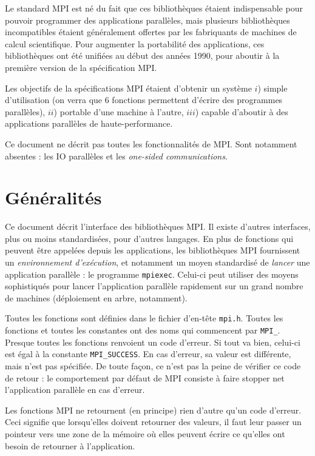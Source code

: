 Le standard MPI est né du fait que ces bibliothèques étaient
indispensable pour pouvoir programmer des applications parallèles,
mais plusieurs bibliothèques incompatibles étaient généralement offertes
par les fabriquants de machines de calcul scientifique. Pour augmenter
la portabilité des applications, ces bibliothèques ont été unifiées au
début des années 1990, pour aboutir à la première version de la
spécification MPI.

Les objectifs de la spécifications MPI étaient d'obtenir un système $i$) simple
d'utilisation (on verra que 6 fonctions permettent d'écrire des programmes
parallèles), $ii$) portable d'une machine à l'autre, $iii$) capable d'aboutir à
des applications parallèles de haute-performance.

Ce document ne décrit pas toutes les fonctionnalités de MPI. Sont notamment
absentes : les IO parallèles et les \og \emph{one-sided communications}\fg.

\section{Généralités}

Ce document décrit l'interface  des bibliothèques MPI. Il existe
d'autres interfaces, plus ou moins standardisées, pour d'autres langages. En
plus de fonctions qui peuvent être appelées depuis les applications, les
bibliothèques MPI fournissent un \emph{environnement d'exécution}, et notamment
un moyen standardisé de \emph{lancer} une application parallèle : le programme
\texttt{mpiexec}. Celui-ci peut utiliser des moyens sophistiqués pour lancer
l'application parallèle rapidement sur un grand nombre de machines (déploiement
en arbre, notamment).

Toutes les fonctions sont définies dans le fichier d'en-tête
\texttt{mpi.h}. Toutes les fonctions et toutes les constantes ont des noms qui
commencent par \texttt{MPI\_}. Presque toutes les fonctions renvoient un code
d'erreur. Si tout va bien, celui-ci est égal à la constante
\texttt{MPI\_SUCCESS}. En cas d'erreur, sa valeur est différente, mais n'est pas
spécifiée. De toute façon, ce n'est pas la peine de vérifier ce code de retour :
le comportement par défaut de MPI consiste à faire stopper net l'application
parallèle en cas d'erreur.

Les fonctions MPI ne retournent (en principe) rien d'autre qu'un code
d'erreur. Ceci signifie que lorsqu'elles doivent retourner des valeurs, il faut
leur passer un pointeur vers une zone de la mémoire où elles peuvent écrire ce
qu'elles ont besoin de retourner à l'application.

